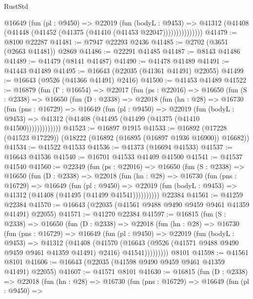 \begin{lexlean}{RustStd}
\begin{coremodule}
                @16649
                  (fun (pl : @9450) =>
                  @22019
                    (fun (bodyL : @9453) =>
                    @41312 (@41408 (@41448 (@41452 (@41375 (@41410 (@41453 @22047)))))))))))))))
@41479 := @8100 @22287
@41481 := @7947 @22293 @2436
@41485 := @2702 (@3651 (@2663 @41481)) @2869
@41486 := @22291 @41485
@41487 := @8143 @41486
@41489 := @41479 (@8141 @41487)
@41490 := @41478 @41489
@41491 := @41443 @41489
@41495 := @16643 (@22035 (@41361 @41491) @22055)
@41499 := @16643 (@9526 (@41366 @41491) @2416)
@41500 := @41453 @41489
@41522 := @16879
    (fun (Γ : @16654) =>
    @22017
      (fun (ps : @22016) =>
      @16650
        (fun (S : @2338) =>
        @16650
          (fun (D : @2338) =>
          @22018
            (fun (hn : @28) =>
            @16730
              (fun (pns : @16729) =>
              @16649
                (fun (pl : @9450) =>
                @22019
                  (fun (bodyL : @9453) =>
                  @41312 (@41408 (@41495 (@41499 (@41375 (@41410 @41500)))))))))))))
@41523 := @16897 @1915
@41533 := @16892 (@17228 (@41523 @17229)) (@18222 (@16892 (@16895 (@16897 @1936 @16900)) @16682))
@41534 := @41522 @41533
@41536 := @41373 (@16694 @41533)
@41537 := @16643 @41536
@41540 := @16701 @41533 @41409 @41500
@41541 := @41537 @41540
@41560 := @22349
    (fun (ps : @22016) =>
    @16650
      (fun (S : @2338) =>
      @16650
        (fun (D : @2338) =>
        @22018
          (fun (hn : @28) =>
          @16730
            (fun (pns : @16729) =>
            @16649
              (fun (pl : @9450) =>
              @22019 (fun (bodyL : @9453) => @41312 (@41408 (@41495 (@41499 @41541))))))))))
    @22384
@41561 := @41259 @22384
@41570 := @16643 (@22035 (@41561 @9488 @9490 @9459 @9461 @41359 @41491) @22055)
@41571 := @41270 @22384
@41597 := @16815
    (fun (S : @2338) =>
    @16650
      (fun (D : @2338) =>
      @22018
        (fun (hn : @28) =>
        @16730
          (fun (pns : @16729) =>
          @16649
            (fun (pl : @9450) =>
            @22019
              (fun (bodyL : @9453) =>
              @41312
                (@41408
                  (@41570
                    (@16643
                      (@9526 (@41571 @9488 @9490 @9459 @9461 @41359 @41491) @2416)
                      @41541)))))))))
    @8101
@41598 := @41561 @8101
@41606 := @16643 (@22035 (@41598 @9490 @9459 @9461 @41359 @41491) @22055)
@41607 := @41571 @8101
@41630 := @16815
    (fun (D : @2338) =>
    @22018
      (fun (hn : @28) =>
      @16730
        (fun (pns : @16729) =>
        @16649
          (fun (pl : @9450) =>

\end{coremodule}
\end{lexlean}
